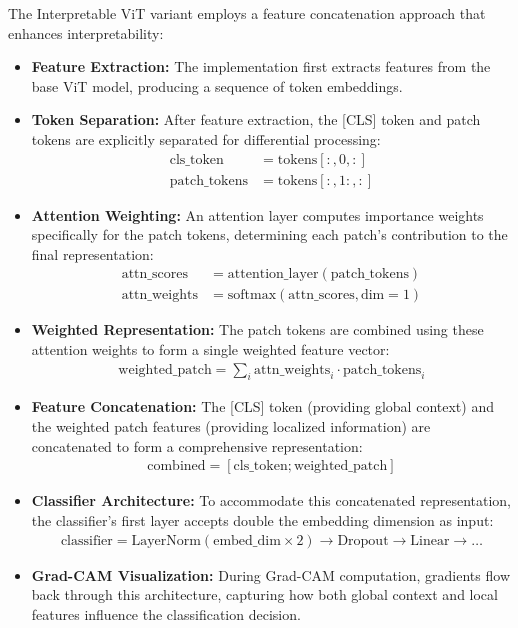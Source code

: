 \documentclass[a4paper,12pt]{report}
\begin{document}
The Interpretable ViT variant employs a feature concatenation approach that enhances interpretability:

\begin{itemize}
\item \textbf{Feature Extraction:} The implementation first extracts features from the base ViT model, producing a sequence of token embeddings.

\item \textbf{Token Separation:} After feature extraction, the [CLS] token and patch tokens are explicitly separated for differential processing:
\begin{align}
\text{cls\_token} &= \text{tokens}[:, 0, :] \\
\text{patch\_tokens} &= \text{tokens}[:, 1:, :]
\end{align}

\item \textbf{Attention Weighting:} An attention layer computes importance weights specifically for the patch tokens, determining each patch's contribution to the final representation:
\begin{align}
\text{attn\_scores} &= \text{attention\_layer}(\text{patch\_tokens}) \\
\text{attn\_weights} &= \text{softmax}(\text{attn\_scores}, \text{dim}=1)
\end{align}

\item \textbf{Weighted Representation:} The patch tokens are combined using these attention weights to form a single weighted feature vector:
\begin{align}
\text{weighted\_patch} = \sum_{i} \text{attn\_weights}_i \cdot \text{patch\_tokens}_i
\end{align}

\item \textbf{Feature Concatenation:} The [CLS] token (providing global context) and the weighted patch features (providing localized information) are concatenated to form a comprehensive representation:
\begin{align}
\text{combined} = [\text{cls\_token}; \text{weighted\_patch}]
\end{align}

\item \textbf{Classifier Architecture:} To accommodate this concatenated representation, the classifier's first layer accepts double the embedding dimension as input:
\begin{align}
\text{classifier} = \text{LayerNorm}(\text{embed\_dim} \times 2) \rightarrow \text{Dropout} \rightarrow \text{Linear} \rightarrow \ldots
\end{align}

\item \textbf{Grad-CAM Visualization:} During Grad-CAM computation, gradients flow back through this architecture, capturing how both global context and local features influence the classification decision.
\end{itemize}
\end{document}

